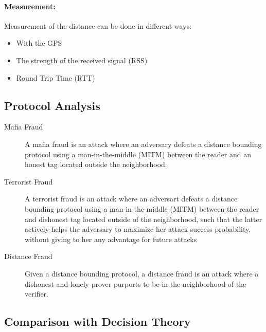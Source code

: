 \paragraph{Measurement:}
Measurement of the distance can be done in different ways:
\begin{itemize}
    \item With the GPS
    \item The strength of the received signal (RSS)
    \item Round Trip Time (RTT)
\end{itemize}


\subsection{Protocol Analysis}
\begin{description}
    \item[Mafia Fraud] A mafia fraud is an attack where an adversary defeats a
    distance bounding protocol using a man-in-the-middle (MITM) between the
    reader and an honest tag located outside the neighborhood.
    \item[Terrorist Fraud] A terrorist fraud is an attack where an adversart
    defeats a distance bounding protocol using a man-in-the-middle (MITM)
    between the reader and dishonest tag located outside of the neighborhood,
    such that the latter actively helps the adversary to maximize her attack
    success probability, without giving to her any advantage for future attacks
    \item[Distance Fraud] Given a distance bounding protocol, a distance fraud
    is an attack where a dishonest and lonely prover purports to be in the
    neighborhood of the verifier.
\end{description}


\subsection{Comparison with Decision Theory}
